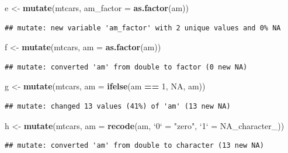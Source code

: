 \documentclass[
]{book}
\newenvironment{Shaded}{\begin{snugshade}}{\end{snugshade}}
\newcommand{\DataTypeTok}[1]{\textcolor[rgb]{0.13,0.29,0.53}{#1}}
\newcommand{\DecValTok}[1]{\textcolor[rgb]{0.00,0.00,0.81}{#1}}
\newcommand{\KeywordTok}[1]{\textcolor[rgb]{0.13,0.29,0.53}{\textbf{#1}}}
\newcommand{\NormalTok}[1]{#1}
\newcommand{\OperatorTok}[1]{\textcolor[rgb]{0.81,0.36,0.00}{\textbf{#1}}}
\newcommand{\OtherTok}[1]{\textcolor[rgb]{0.56,0.35,0.01}{#1}}
\newcommand{\StringTok}[1]{\textcolor[rgb]{0.31,0.60,0.02}{#1}}
\begin{document}
\begin{Shaded}
\begin{Highlighting}[]
\NormalTok{e <-}\StringTok{ }\KeywordTok{mutate}\NormalTok{(mtcars, }\DataTypeTok{am_factor =} \KeywordTok{as.factor}\NormalTok{(am))}
\end{Highlighting}
\end{Shaded}

\begin{verbatim}
## mutate: new variable 'am_factor' with 2 unique values and 0% NA
\end{verbatim}

\begin{Shaded}
\begin{Highlighting}[]
\NormalTok{f <-}\StringTok{ }\KeywordTok{mutate}\NormalTok{(mtcars, }\DataTypeTok{am =} \KeywordTok{as.factor}\NormalTok{(am))}
\end{Highlighting}
\end{Shaded}

\begin{verbatim}
## mutate: converted 'am' from double to factor (0 new NA)
\end{verbatim}

\begin{Shaded}
\begin{Highlighting}[]
\NormalTok{g <-}\StringTok{ }\KeywordTok{mutate}\NormalTok{(mtcars, }\DataTypeTok{am =} \KeywordTok{ifelse}\NormalTok{(am }\OperatorTok{==}\StringTok{ }\DecValTok{1}\NormalTok{, }\OtherTok{NA}\NormalTok{, am))}
\end{Highlighting}
\end{Shaded}

\begin{verbatim}
## mutate: changed 13 values (41%) of 'am' (13 new NA)
\end{verbatim}

\begin{Shaded}
\begin{Highlighting}[]
\NormalTok{h <-}\StringTok{ }\KeywordTok{mutate}\NormalTok{(mtcars, }\DataTypeTok{am =} \KeywordTok{recode}\NormalTok{(am, }\StringTok{`}\DataTypeTok{0}\StringTok{`}\NormalTok{ =}\StringTok{ "zero"}\NormalTok{, }\StringTok{`}\DataTypeTok{1}\StringTok{`}\NormalTok{ =}\StringTok{ }\OtherTok{NA_character_}\NormalTok{))}
\end{Highlighting}
\end{Shaded}

\begin{verbatim}
## mutate: converted 'am' from double to character (13 new NA)
\end{verbatim}
\end{document}
